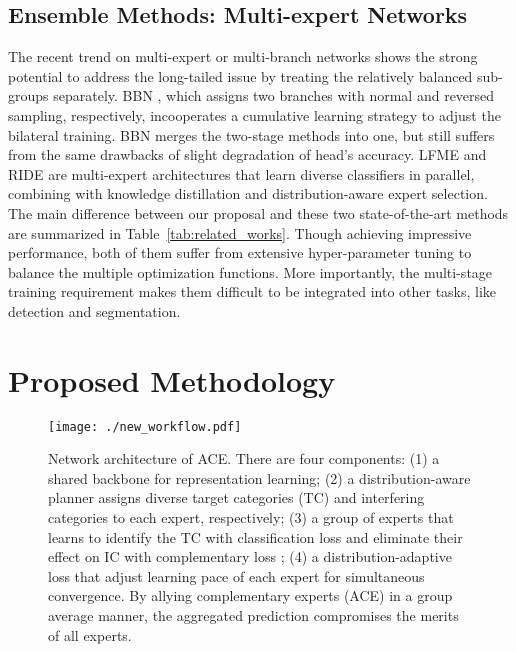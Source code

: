 \documentclass[10pt,twocolumn,letterpaper]{article}
\begin{document}
\subsection{Ensemble Methods: Multi-expert Networks} 
The recent trend on multi-expert or multi-branch networks shows the strong potential to address the long-tailed issue by treating the relatively balanced sub-groups separately. BBN \cite{zhou2020bbn}, which assigns two branches with normal and reversed sampling, respectively, incooperates a cumulative learning strategy to adjust the bilateral training. BBN merges the two-stage methods into one, but still suffers from the same drawbacks of slight degradation of head’s accuracy. LFME \cite{xiang2020learning} and RIDE \cite{wang2020long} are multi-expert architectures that learn diverse classifiers in parallel, combining with knowledge distillation and distribution-aware expert selection. The main difference between our proposal and these two state-of-the-art methods are summarized in Table~\ref{tab:related_works}. Though achieving impressive performance, both of them suffer from extensive hyper-parameter tuning to balance the multiple optimization functions. More importantly, the multi-stage training requirement makes them difficult to be integrated into other tasks, like detection and segmentation.

\section{Proposed Methodology}

\begin{figure*}[t]
\begin{center}
\texttt{[image: ./new\_workflow.pdf]}
\end{center}
   \caption{Network architecture of ACE. There are four components: (1) a shared backbone for representation learning; (2) a distribution-aware planner assigns diverse target categories (TC) and interfering categories to each expert, respectively; (3) a group of experts that learns to identify the TC with classification loss  and eliminate their effect on IC with complementary loss ; (4) a distribution-adaptive loss that adjust learning pace  of each expert for simultaneous convergence. By allying complementary experts (ACE) in a group average manner, the aggregated prediction compromises the merits of all experts.}
\label{fig:ACE}
\end{figure*}
\end{document}
